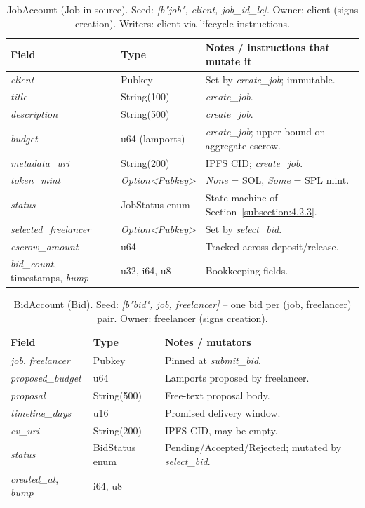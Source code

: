 \begin{table}[H]
\centering
\caption{JobAccount (Job in source). Seed: \emph{[b"job", client, job\_id\_le]}. Owner: client (signs creation). Writers: client via lifecycle instructions.}
\label{table:pda_job}
\small
\begin{tabular}{|l|l|p{6.5cm}|}
\hline
\textbf{Field} & \textbf{Type} & \textbf{Notes / instructions that mutate it} \\ \hline
\emph{client} & Pubkey & Set by \emph{create\_job}; immutable. \\ \hline
\emph{title} & String(100) & \emph{create\_job}. \\ \hline
\emph{description} & String(500) & \emph{create\_job}. \\ \hline
\emph{budget} & u64 (lamports) & \emph{create\_job}; upper bound on aggregate escrow. \\ \hline
\emph{metadata\_uri} & String(200) & IPFS CID; \emph{create\_job}. \\ \hline
\emph{token\_mint} & \emph{Option\textless{}Pubkey\textgreater{}} & \emph{None} = SOL, \emph{Some} = SPL mint. \\ \hline
\emph{status} & JobStatus enum & State machine of Section~\ref{subsection:4.2.3}. \\ \hline
\emph{selected\_freelancer} & \emph{Option\textless{}Pubkey\textgreater{}} & Set by \emph{select\_bid}. \\ \hline
\emph{escrow\_amount} & u64 & Tracked across deposit/release. \\ \hline
\emph{bid\_count}, timestamps, \emph{bump} & u32, i64, u8 & Bookkeeping fields. \\ \hline
\end{tabular}
\end{table}

\begin{table}[H]
\centering
\caption{BidAccount (Bid). Seed: \emph{[b"bid", job, freelancer]} -- one bid per (job, freelancer) pair. Owner: freelancer (signs creation).}
\label{table:pda_bid}
\small
\begin{tabular}{|l|l|p{6.5cm}|}
\hline
\textbf{Field} & \textbf{Type} & \textbf{Notes / mutators} \\ \hline
\emph{job}, \emph{freelancer} & Pubkey & Pinned at \emph{submit\_bid}. \\ \hline
\emph{proposed\_budget} & u64 & Lamports proposed by freelancer. \\ \hline
\emph{proposal} & String(500) & Free-text proposal body. \\ \hline
\emph{timeline\_days} & u16 & Promised delivery window. \\ \hline
\emph{cv\_uri} & String(200) & IPFS CID, may be empty. \\ \hline
\emph{status} & BidStatus enum & Pending/Accepted/Rejected; mutated by \emph{select\_bid}. \\ \hline
\emph{created\_at}, \emph{bump} & i64, u8 & \\ \hline
\end{tabular}
\end{table}

